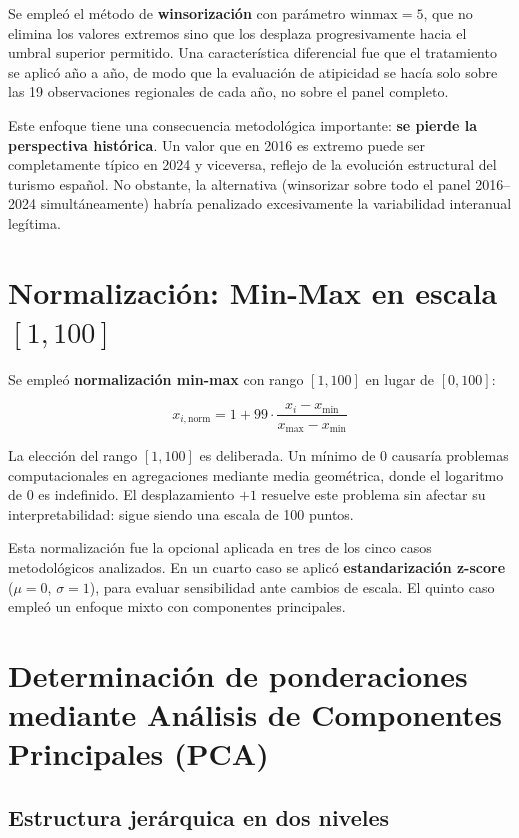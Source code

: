Se empleó el método de \textbf{winsorización} con parámetro $\text{winmax}=5$, que no elimina los valores extremos sino que los desplaza progresivamente hacia el umbral superior permitido. Una característica diferencial fue que el tratamiento se aplicó año a año, de modo que la evaluación de atipicidad se hacía solo sobre las 19 observaciones regionales de cada año, no sobre el panel completo.

Este enfoque tiene una consecuencia metodológica importante: \textbf{se pierde la perspectiva histórica}. Un valor que en 2016 es extremo puede ser completamente típico en 2024 y viceversa, reflejo de la evolución estructural del turismo español. No obstante, la alternativa (winsorizar sobre todo el panel 2016--2024 simultáneamente) habría penalizado excesivamente la variabilidad interanual legítima.

\section{Normalización: Min-Max en escala $[1, 100]$}

Se empleó \textbf{normalización min-max} con rango $[1, 100]$ en lugar de $[0, 100]$:

\begin{equation}
    x_{i,\text{norm}} = 1 + 99 \cdot \frac{x_i - x_{\min}}{x_{\max} - x_{\min}}
\end{equation}

La elección del rango $[1, 100]$ es deliberada. Un mínimo de 0 causaría problemas computacionales en agregaciones mediante media geométrica, donde el logaritmo de 0 es indefinido. El desplazamiento $+1$ resuelve este problema sin afectar su interpretabilidad: sigue siendo una escala de 100 puntos.

Esta normalización fue la opcional aplicada en tres de los cinco casos metodológicos analizados. En un cuarto caso se aplicó \textbf{estandarización z-score} ($\mu = 0$, $\sigma = 1$), para evaluar sensibilidad ante cambios de escala. El quinto caso empleó un enfoque mixto con componentes principales.

\section{Determinación de ponderaciones mediante Análisis de Componentes Principales (PCA)}

\subsection{Estructura jerárquica en dos niveles}

